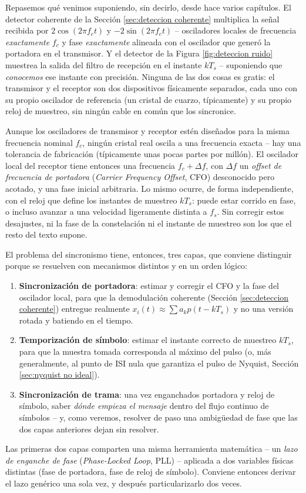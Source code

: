 Repasemos qué venimos suponiendo, sin decirlo, desde hace varios capítulos. El detector coherente de la Sección \ref{sec:deteccion coherente} multiplica la señal recibida por $2\cos(2\pi f_c t)$ y $-2\sin(2\pi f_c t)$ -- osciladores locales de frecuencia \emph{exactamente} $f_c$ y fase \emph{exactamente} alineada con el oscilador que generó la portadora en el transmisor. Y el detector de la Figura \ref{fig:deteccion ruido} muestrea la salida del filtro de recepción en el instante $kT_s$ -- suponiendo que \emph{conocemos} ese instante con precisión. Ninguna de las dos cosas es gratis: el transmisor y el receptor son dos dispositivos físicamente separados, cada uno con su propio oscilador de referencia (un cristal de cuarzo, típicamente) y su propio reloj de muestreo, sin ningún cable en común que los sincronice.

Aunque los osciladores de transmisor y receptor estén diseñados para la misma frecuencia nominal $f_c$, ningún cristal real oscila a una frecuencia exacta -- hay una tolerancia de fabricación (típicamente unas pocas partes por millón). El oscilador local del receptor tiene entonces una frecuencia $f_c+\Delta f$, con $\Delta f$ un \emph{offset de frecuencia de portadora} (\emph{Carrier Frequency Offset}, CFO) desconocido pero acotado, y una fase inicial arbitraria. Lo mismo ocurre, de forma independiente, con el reloj que define los instantes de muestreo $kT_s$: puede estar corrido en fase, o incluso avanzar a una velocidad ligeramente distinta a $f_s$. Sin corregir estos desajustes, ni la fase de la constelación ni el instante de muestreo son los que el resto del texto supone.

El problema del sincronismo tiene, entonces, tres capas, que conviene distinguir porque se resuelven con mecanismos distintos y en un orden lógico:
\begin{enumerate}
    \item \textbf{Sincronización de portadora}: estimar y corregir el CFO y la fase del oscilador local, para que la demodulación coherente (Sección \ref{sec:deteccion coherente}) entregue realmente $x_i(t)\approx\sum a_k p(t-kT_s)$ y no una versión rotada y batiendo en el tiempo.
    \item \textbf{Temporización de símbolo}: estimar el instante correcto de muestreo $kT_s$, para que la muestra tomada corresponda al máximo del pulso (o, más generalmente, al punto de ISI nula que garantiza el pulso de Nyquist, Sección \ref{sec:nyquist no ideal}).
    \item \textbf{Sincronización de trama}: una vez enganchados portadora y reloj de símbolo, saber \emph{dónde empieza el mensaje} dentro del flujo continuo de símbolos -- y, como veremos, resolver de paso una ambigüedad de fase que las dos capas anteriores dejan sin resolver.
\end{enumerate}
Las primeras dos capas comparten una misma herramienta matemática -- un \emph{lazo de enganche de fase} (\emph{Phase-Locked Loop}, PLL) -- aplicada a dos variables físicas distintas (fase de portadora, fase de reloj de símbolo). Conviene entonces derivar el lazo genérico una sola vez, y después particularizarlo dos veces.

